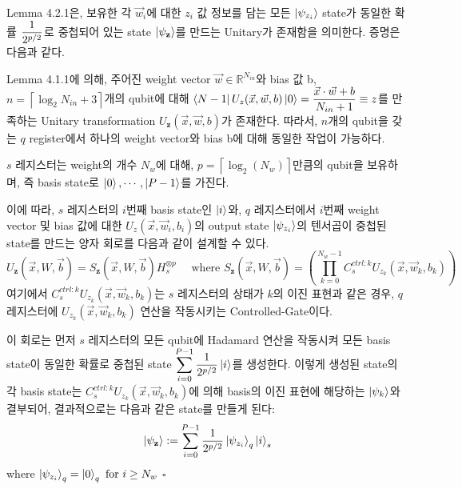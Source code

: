 \begin{lemma}
\end{lemma}

Lemma 4.2.1은, 보유한 각 \(\vec{w}_i\)에 대한 \(\displaystyle {z}_i\) 값 정보를 담는 모든 \(\ket{\psi_{z_i}}\) state가 동일한 확률 \(\displaystyle {1 \over {2^{p/2}}}\)로 중첩되어 있는 state \(\ket{\psi_{\mathbf z}}\)를 만드는 Unitary가 존재함을 의미한다. 증명은 다음과 같다.

\begin{pf}
    Lemma 4.1.1에 의해, 주어진 weight vector $\vec{w} \in \mathbb{R}^{N_{in}}$와 bias 값 b, \(n = \left\lceil \log_2{N_{in}} + 3 \right\rceil\)개의 qubit에 대해 \(\displaystyle \bra{N-1}U_z(\vec{x},\vec{w},b)\ket{0} = \frac{\vec{x}\cdot \vec{w}+b}{N_{in}+1} \equiv z\)를 만족하는 Unitary transformation \(U_{\mathbf z}(\vec{x},\vec{w},b)\)가 존재한다. 따라서, $n$개의 qubit을 갖는 $q$ register에서 하나의 weight vector와 bias b에 대해 동일한 작업이 가능하다.

    $s$ 레지스터는 weight의 개수 \(N_w\)에 대해, \(p = \left\lceil \log_2(N_w) \right\rceil\)만큼의 qubit을 보유하며, 즉 basis state로 \(\ket{0}, \cdots, \ket{P-1}\)를 가진다.

    이에 따라, \(s\) 레지스터의 \(i\)번째 basis state인 \(\ket{i}\)와, \(q\) 레지스터에서 \(i\)번째 weight vector 및 bias 값에 대한 \(U_z(\vec{x}, \vec{w}_i, b_i)\)의 output state \(\ket{\psi_{z_i}}\)의 텐서곱이 중첩된 state를 만드는 양자 회로를 다음과 같이 설계할 수 있다.
    \[
        U_{\mathbf z}(\vec{x}, W, \vec{b}) = S_{\mathbf z}(\vec{x}, W, \vec{b}) H_s^{\otimes p} \quad \text{ where } S_{\mathbf z}(\vec{x}, W, \vec{b})= \left(\prod_{k=0}^{N_w-1}C_{s}^{ctrl : k}U_{z_k}(\vec{x}, \vec{w}_k, b_k)\right)
    \]
    여기에서 \(C_{s}^{ctrl:k}U_{z_k}(\vec{x}, \vec{w}_k, b_k)\)는 \(s\) 레지스터의 상태가 \(k\)의 이진 표현과 같은 경우, \(q\) 레지스터에 \(U_{z_k}(\vec{x}, \vec{w}_k, b_k)\) 연산을 작동시키는 Controlled-Gate이다.

    이 회로는 먼저 \(s\) 레지스터의 모든 qubit에 Hadamard 연산을 작동시켜 모든 basis state이 동일한 확률로 중첩된 state \(\displaystyle \sum_{i=0}^{P-1} {1\over {2^{p/2}}}\ket{i}\)를 생성한다. 이렇게 생성된 state의 각 basis state는 \(C_{s}^{ctrl:k}U_{z_k}(\vec{x}, \vec{w}_k, b_k)\)에 의해 basis의 이진 표현에 해당하는 $\ket{\psi_k}$와 결부되어, 결과적으로는 다음과 같은 state를 만들게 된다:
    \[
        \ket{\psi_{\mathbf{z}}} := \sum_{i=0}^{P-1} {1\over {2^{p/2}}} \ket{\psi_{z_i}}_q \ket{i}_s
    \]
    where \(\ket{\psi_{z_i}}_q = \ket{0}_q \text{ for } i \ge N_w\) \quad $\square$
\end{pf}

